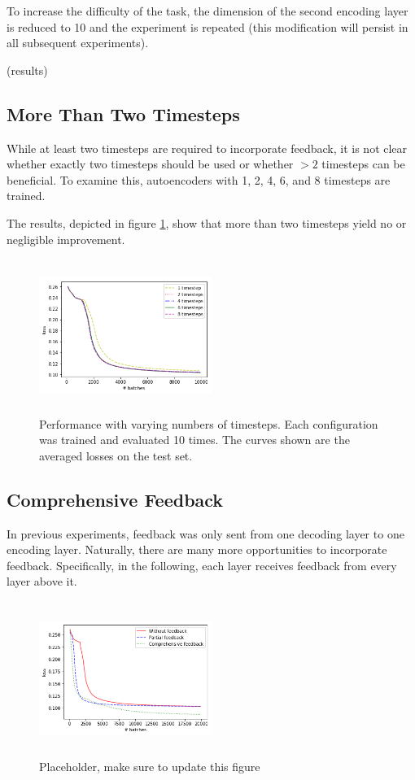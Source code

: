 \documentclass{article}
\begin{document}
To increase the difficulty of the task, the dimension of the second encoding layer is reduced to 10 and the experiment is repeated (this modification will persist in all subsequent experiments).

(results) 

\subsection{More Than Two Timesteps}
\label{timesteps}
While at least two timesteps are required to incorporate feedback, it is not clear whether exactly two timesteps should be used or whether $>2$ timesteps can be beneficial. To examine this, autoencoders with 1, 2, 4, 6, and 8 timesteps are trained. 

The results, depicted in figure \ref{fig:timesteps}, show that more than two timesteps yield no or negligible improvement. 


\begin{figure}
      \centering
      \includegraphics[width=0.5\textwidth,height=5cm,keepaspectratio]{img/timesteps_test.png}
      \caption{Performance with varying numbers of timesteps. Each configuration was trained and evaluated 10 times. The curves shown are the averaged losses on the test set.}
      \label{fig:timesteps}
  \end{figure}
 
 
\subsection{Comprehensive Feedback}
In previous experiments, feedback was only sent from one decoding layer to one encoding layer. Naturally, there are many more opportunities to incorporate feedback. Specifically, in the following, each layer receives feedback from every layer above it.

  \begin{figure}[H]
      \centering
      \includegraphics[width=0.5\textwidth,height=5cm,keepaspectratio]{img/fullfb.png}
      \caption{Placeholder, make sure to update this figure}
      \label{fig:fullfeedback}
  \end{figure}
  
\end{document}
